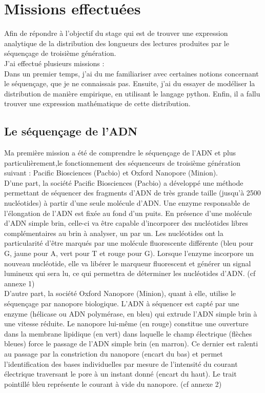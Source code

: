 \documentclass[11pt,a4paper]{article} %
\begin{document}
\section{Missions effectuées} 
Afin de répondre à l'objectif du stage qui est de trouver une expression analytique de la distribution des longueurs des lectures produites par le séquençage de troisième génération.\\
J'ai effectué plusieurs missions :\\
Dans un premier temps, j'ai du me familiariser avec certaines notions concernant le séquençage, que je ne connaissais pas. Ensuite, j'ai du essayer de modéliser la distribution de manière empirique, en utilisant le langage python. Enfin, il a fallu trouver une expression mathématique de cette distribution.\subsection{Le séquençage de l'ADN}
Ma première mission a été de comprendre le séquençage de l'ADN et plus particulièrement,le fonctionnement des séquenceurs de troisième génération suivant : Pacific Biosciences (Pacbio) et Oxford Nanopore (Minion).\\
D'une part, la société Pacific Biosciences (Pacbio) a développé une méthode permettant de séquencer des fragments d'ADN de très grande taille (jusqu'à 2500 nucléotides) à partir d'une seule molécule d'ADN. Une enzyme responsable de l'élongation de l'ADN est fixée au fond d'un puits. En présence d'une molécule d'ADN simple brin, celle-ci va être capable d'incorporer des nucléotides libres complémentaires au brin à analyser, un par un. Les nucléotides ont la particularité d'être marqués par une molécule fluorescente différente (bleu pour G, jaune pour A, vert pour T et rouge pour G). Lorsque l'enzyme incorpore un nouveau nucléotide, elle va libérer le marqueur fluorescent et générer un signal lumineux qui sera lu, ce qui permettra de déterminer les nucléotides d'ADN.   (cf annexe 1)
\\
D'autre part, la société Oxford Nanopore (Minion), quant à elle, utilise le séquençage par nanopore biologique. L’ADN à séquencer est capté par une enzyme (hélicase ou ADN polymérase, en bleu) qui extrude l’ADN simple brin à une vitesse réduite. Le nanopore lui-même (en rouge) constitue une ouverture dans la membrane lipidique (en vert) dans laquelle le champ électrique (flèches bleues) force le passage de l’ADN simple brin (en marron). Ce dernier est ralenti au passage par la constriction du nanopore (encart du bas) et permet l’identification des bases individuelles par mesure de l’intensité du courant électrique traversant le pore à un instant donné (encart du haut). Le trait pointillé bleu représente le courant à vide du nanopore. (cf annexe 2) \\
\end{document}
